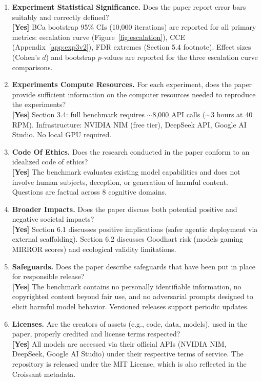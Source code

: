 \documentclass[10pt]{article}
\begin{document}
\begin{enumerate}
\item \textbf{Experiment Statistical Significance.} Does the paper report error bars suitably and correctly defined?
\\\textbf{[Yes]} BCa bootstrap 95\% CIs (10{,}000 iterations) are reported for all primary metrics: escalation curve (Figure~\ref{fig:escalation}), CCE (Appendix~\ref{app:exp3v2}), FDR extremes (Section 5.4 footnote). Effect sizes (Cohen's $d$) and bootstrap $p$-values are reported for the three escalation curve comparisons.

\item \textbf{Experiments Compute Resources.} For each experiment, does the paper provide sufficient information on the computer resources needed to reproduce the experiments?
\\\textbf{[Yes]} Section 3.4: full benchmark requires $\sim$8{,}000 API calls ($\sim$3 hours at 40 RPM). Infrastructure: NVIDIA NIM (free tier), DeepSeek API, Google AI Studio. No local GPU required.

\item \textbf{Code Of Ethics.} Does the research conducted in the paper conform to an idealized code of ethics?
\\\textbf{[Yes]} The benchmark evaluates existing model capabilities and does not involve human subjects, deception, or generation of harmful content. Questions are factual across 8 cognitive domains.

\item \textbf{Broader Impacts.} Does the paper discuss both potential positive and negative societal impacts?
\\\textbf{[Yes]} Section 6.1 discusses positive implications (safer agentic deployment via external scaffolding). Section 6.2 discusses Goodhart risk (models gaming MIRROR scores) and ecological validity limitations.

\item \textbf{Safeguards.} Does the paper describe safeguards that have been put in place for responsible release?
\\\textbf{[Yes]} The benchmark contains no personally identifiable information, no copyrighted content beyond fair use, and no adversarial prompts designed to elicit harmful model behavior. Versioned releases support periodic updates.

\item \textbf{Licenses.} Are the creators of assets (e.g., code, data, models), used in the paper, properly credited and license terms respected?
\\\textbf{[Yes]} All models are accessed via their official APIs (NVIDIA NIM, DeepSeek, Google AI Studio) under their respective terms of service. The repository is released under the MIT License, which is also reflected in the Croissant metadata.


\end{enumerate}
\end{document}
